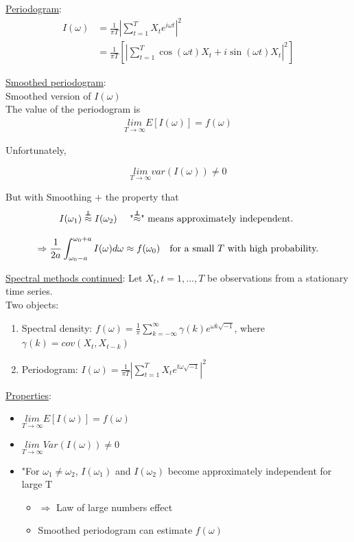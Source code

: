 \underline{Periodogram}:
\begin{align*}
    I(\omega) &= \frac{1}{\pi T} \left | \sum_{t=1}^T X_t e^{i\omega t}\right |^2\\
    &= \frac{1}{\pi T} \left[ \left| \sum_{t=1}^T \cos(\omega t)X_t + i \sin(\omega t)X_t \right |^2 \right]
\end{align*}

\underline{Smoothed periodogram}:  \\

Smoothed version of $I(\omega)$\\

The value of the periodogram is 
\begin{align*}
    \underset{T\rightarrow\infty}{lim} E\left[I(\omega) \right] = f(\omega)
\end{align*}

Unfortunately, 

\[\underset{T \rightarrow \infty}{lim} var(I(\omega)) \neq 0 \]

But with Smoothing + the property that 
\[I(\omega_1) \overset{\ind}{\approx} I(\omega_2) \text{
\quad "$\overset{\ind}{\approx}$" means approximately independent. 
} \]


\[\Rightarrow \frac{1}{2a} \int_{\omega_0 - a}^{\omega_0 + a} I(\omega)d\omega \approx f(\omega_0) \text{\quad for a small $T$ with high probability.}\]



\underline{Spectral methods continued}:
\bigskip
Let $X_t, t=1,...,T$ be observations from a stationary time series. \\

Two objects:
\begin{enumerate}
    \item Spectral density: $f(\omega)=\frac{1}{\pi} \sum_{k=-\infty}^\infty \gamma(k) e^{\omega k \sqrt{-1}}$, where $\gamma(k) = cov(X_t, X_{t-k})$
    \item Periodogram: $I(\omega) = \frac{1}{\pi T} \left| \sum_{t=1}^T X_t e^{t\omega \sqrt{-1}} \right|^2$
\end{enumerate}

\underline{Properties}: 
\begin{itemize}
    \item $\underset{T\rightarrow\infty}{lim} E\left[I(\omega) \right] = f(\omega)$ 
    \item $\underset{T\rightarrow\infty}{lim} Var(I(\omega))\neq0$
    \item "For $\omega_1 \neq \omega_2$, $I(\omega_1)$ and $I(\omega_2)$ become approximately independent for large T
    \begin{itemize}
        \item[] $\Rightarrow$ Law of large numbers effect
        \item[] Smoothed periodogram can estimate $f(\omega)$ 
    \end{itemize}
\end{itemize}

